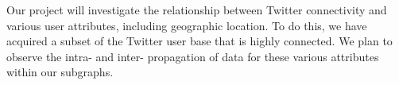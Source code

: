 Our project will investigate the relationship between Twitter connectivity and various user attributes, including geographic location.  To do this, we have acquired a subset of the Twitter user base that is highly connected.  We plan to observe the intra- and inter- propagation of data for these various attributes within our subgraphs.